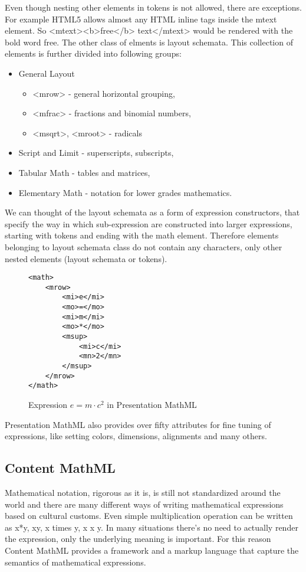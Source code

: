 \documentclass[11pt,oneside,final]{fithesis2}
\begin{document}
Even though nesting other elements in tokens is not allowed, there are exceptions. For example HTML5 allows almost any HTML inline tags inside the mtext element. So <mtext><b>free</b> text</mtext> would be rendered with the bold word free.
The other class of elments is layout schemata. This collection of elements is further divided into following groups:
\begin{itemize}
\item General Layout
	\begin{itemize}
	\item <mrow> - general horizontal grouping,
	\item <mfrac> - fractions and binomial numbers,
	\item <msqrt>, <mroot> - radicals
	\end{itemize}
\item Script and Limit - superscripts, subscripts, 
\item Tabular Math - tables and matrices,
\item Elementary Math - notation for lower grades mathematics.
\end{itemize}
We can thought of the layout schemata as a form of expression constructors, that specify the way in which sub-expression are constructed into larger expressions, starting with tokens and ending with the math element. Therefore elements belonging to layout schemata class do not contain any characters, only other nested elements (layout schemata or tokens). 

\begin{figure}[!ht]
\lstset{language=XML,frame=lines}
\begin{lstlisting}
<math>
	<mrow>
		<mi>e</mi>
		<mo>=</mo>
		<mi>m</mi>
		<mo>*</mo>
		<msup>
			<mi>c</mi>
			<mn>2</mn>
		</msup>
	</mrow>
</math>
\end{lstlisting}
\caption{Expression $e=m \cdot c^2$ in Presentation MathML}
\label{fig:presentationmathml}
\end{figure}

Presentation MathML also provides over fifty attributes for fine tuning of expressions, like setting colors, dimensions, alignments and many others.

\subsection{Content MathML}
Mathematical notation, rigorous as it is, is still not standardized around the world and there are many different ways of writing mathematical expressions based on cultural customs. Even simple multiplication operation can be written as x*y, xy, x times y, x x y. In many situations there's no need to actually render the expression, only the underlying meaning is important. For this reason Content MathML provides a framework and a markup language that capture the semantics of mathematical expressions.
\end{document}

